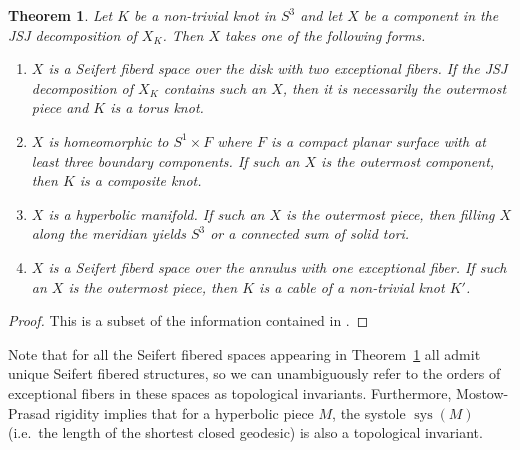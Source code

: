 \documentclass{amsart} %
\DeclareMathOperator{\sys}{sys}
\theoremstyle{thm}
\newtheorem{thm}[Theorem]{Theorem}
\theoremstyle{definition}
\numberwithin{equation}{section}
\begin{document}
\begin{thm}\label{thm:knot_JSJ_decomp}
Let $K$ be a non-trivial knot in $S^3$ and let $X$ be a component in the JSJ decomposition of $X_K$. Then $X$ takes one of the following forms.
\begin{enumerate}
    \item $X$ is a Seifert fiberd space over the disk with two exceptional fibers. If the JSJ decomposition of $X_K$ contains such an $X$, then it is necessarily the outermost piece and $K$ is a torus knot.
    \item $X$ is homeomorphic to $S^1\times F$ where $F$ is a compact planar surface with at least three boundary components. If such an $X$ is the outermost component, then $K$ is a composite knot.
    \item $X$ is a hyperbolic manifold. If such an $X$ is the outermost piece, then filling $X$ along the meridian yields $S^3$ or a connected sum of solid tori.
    \item $X$ is a Seifert fiberd space over the annulus with one exceptional fiber. If such an $X$ is the outermost piece, then $K$ is a cable of a non-trivial knot $K'$.
\end{enumerate}
\end{thm}
\begin{proof}
This is a subset of the information contained in \cite[Theorem~4.18]{BudneyJSJ}.
\end{proof}
Note that for all the Seifert fibered spaces appearing in Theorem~\ref{thm:knot_JSJ_decomp} all admit unique Seifert fibered structures, so we can unambiguously refer to the orders of exceptional fibers in these spaces as topological invariants. Furthermore, Mostow-Prasad rigidity implies that for a hyperbolic piece $M$, the systole $\sys(M)$ (i.e.\ the length of the shortest closed geodesic) is also a topological invariant. 
\end{document}
